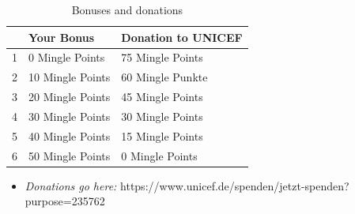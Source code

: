\documentclass[]{article}
\begin{document}
\begin{longtable}[]{@{}lll@{}}
	\caption{Bonuses and donations}
	\label{table:mingle}
	\endfirsthead
	\endhead
	\toprule
	& Your Bonus & Donation to UNICEF\tabularnewline
	\midrule
	\endhead
	1 & 0 Mingle Points & 75 Mingle Points\tabularnewline
	2 & 10 Mingle Points & 60 Mingle Punkte\tabularnewline
	3 & 20 Mingle Points & 45 Mingle Points\tabularnewline
	4 & 30 Mingle Points & 30 Mingle Points\tabularnewline
	5 & 40 Mingle Points & 15 Mingle Points\tabularnewline
                                                                            	6 & 50 Mingle Points & 0 Mingle Points\tabularnewline
	\bottomrule
\end{longtable}


\begin{itemize}
	\item
	\emph{Donations go here:}
	https://www.unicef.de/spenden/jetzt-spenden?purpose=235762
\end{itemize}






\end{document}
